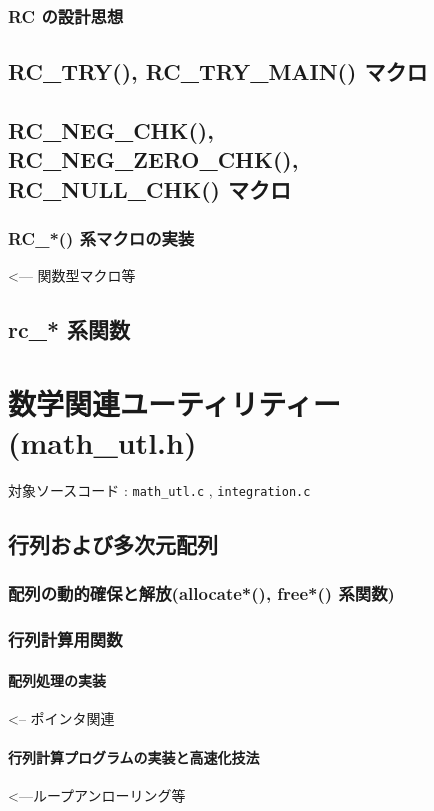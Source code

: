 \documentclass[a4paper,10pt]{jarticle}
\begin{document}
\subsubsection{RC の設計思想}

\subsection{RC\_TRY(), RC\_TRY\_MAIN() マクロ}

\subsection{RC\_NEG\_CHK(), RC\_NEG\_ZERO\_CHK(), RC\_NULL\_CHK() マクロ}
\subsubsection{RC\_*() 系マクロの実装}   <--- 関数型マクロ等

\subsection{rc\_* 系関数}


\section{数学関連ユーティリティー(math\_utl.h)}
対象ソースコード : \verb|math_utl.c| , \verb|integration.c|

\subsection{行列および多次元配列}
\subsubsection{配列の動的確保と解放(allocate*(), free*() 系関数)}
\subsubsection{行列計算用関数}
\paragraph{配列処理の実装}   <-- ポインタ関連
\paragraph{行列計算プログラムの実装と高速化技法}   <---ループアンローリング等
\end{document}
